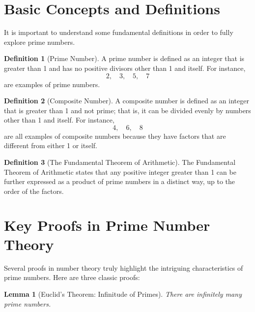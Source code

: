 \documentclass{article}
\theoremstyle{plain}
\newtheorem{lemma}{Lemma}
\theoremstyle{definition}
\newtheorem{definition}{Definition}
\theoremstyle{remark}
\begin{document}

\section{Basic Concepts and Definitions}

It is important to understand some fundamental definitions in order to fully explore prime numbers.

\begin{definition}[Prime Number]
    A prime number is defined as an integer that is greater than 1 and has no positive divisors other than 1 and itself. For instance,
    \[
        2, \quad 3, \quad 5, \quad 7
    \]
    are examples of prime numbers. 
\end{definition}

\begin{definition}[Composite Number]
    A composite number is defined as an integer that is greater than 1 and not prime; that is, it can be divided evenly by numbers other than 1 and itself. For instance,
    \[
        4, \quad 6, \quad 8
    \]
    are all examples of composite numbers because they have factors that are different from either 1 or itself.
\end{definition}

\begin{definition}[The Fundamental Theorem of Arithmetic]
    The Fundamental Theorem of Arithmetic states that any positive integer greater than 1 can be further expressed as a product of prime numbers in a distinct way, up to the order of the factors.
\end{definition}




\section{Key Proofs in Prime Number Theory}

Several proofs in number theory truly highlight the intriguing characteristics of prime numbers. Here are three classic proofs:
\begin{lemma} 
    [Euclid's Theorem: Infinitude of Primes] There are infinitely many prime numbers.
\end{lemma}
\end{document}
